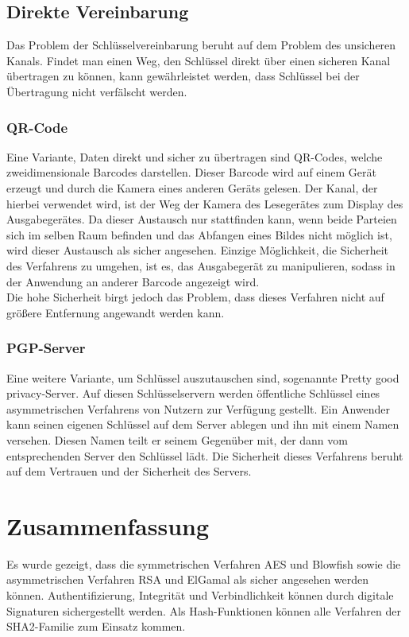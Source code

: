 \documentclass[10pt, a4paper,headsepline]{scrreprt}
\begin{document}
\subsection{Direkte Vereinbarung}
Das Problem der Schlüsselvereinbarung beruht auf dem Problem des unsicheren Kanals. Findet man einen Weg, den Schlüssel direkt über einen sicheren Kanal übertragen zu können, kann gewährleistet werden, dass Schlüssel bei der Übertragung nicht verfälscht werden.
\subsubsection{QR-Code}
Eine Variante, Daten direkt und sicher zu übertragen sind QR-Codes, welche zweidimensionale Barcodes darstellen. Dieser Barcode wird auf einem Gerät erzeugt und durch die Kamera eines anderen Geräts gelesen. Der Kanal, der hierbei verwendet wird, ist der Weg der Kamera des Lesegerätes zum Display des Ausgabegerätes. Da dieser Austausch nur stattfinden kann, wenn beide Parteien sich im selben Raum befinden und das Abfangen eines Bildes nicht möglich ist, wird dieser Austausch als sicher angesehen. Einzige Möglichkeit, die Sicherheit des Verfahrens zu umgehen, ist es, das Ausgabegerät zu manipulieren, sodass in der Anwendung an anderer Barcode angezeigt wird. \\
Die hohe Sicherheit birgt jedoch das Problem, dass dieses Verfahren nicht auf größere Entfernung angewandt werden kann.

\subsubsection{PGP-Server}
Eine weitere Variante, um Schlüssel auszutauschen sind, sogenannte Pretty good privacy-Server. Auf diesen Schlüsselservern werden öffentliche Schlüssel eines asymmetrischen Verfahrens von Nutzern zur Verfügung gestellt. Ein Anwender kann seinen eigenen Schlüssel auf dem Server ablegen und ihn mit einem Namen versehen. Diesen Namen teilt er seinem Gegenüber mit, der dann vom entsprechenden Server den Schlüssel lädt. Die Sicherheit dieses Verfahrens beruht auf dem Vertrauen und der Sicherheit des Servers.


\section {Zusammenfassung}
Es wurde gezeigt, dass die symmetrischen Verfahren AES und Blowfish sowie die asymmetrischen Verfahren RSA und ElGamal als sicher angesehen werden können. Authentifizierung, Integrität und Verbindlichkeit können durch digitale Signaturen sichergestellt werden. Als Hash-Funktionen können alle Verfahren der SHA2-Familie zum Einsatz kommen.
\end{document}

